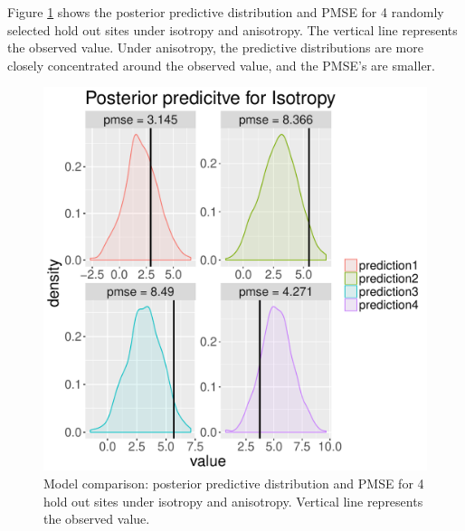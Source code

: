 \documentclass[12pt,twoside]{dukestatscithesis}
\theoremstyle{definition}
\theoremstyle{definition}
\theoremstyle{definition}
\theoremstyle{remark}
\begin{document}
Figure \ref{fig:CRPS} shows the posterior predictive distribution and
PMSE for 4 randomly selected hold out sites under isotropy and
anisotropy. The vertical line represents the observed value. Under
anisotropy, the predictive distributions are more closely concentrated
around the observed value, and the PMSE's are smaller.
\begin{figure}
\includegraphics[scale=0.7]{figure/crps_Iso} \caption{Model comparison: posterior predictive distribution and PMSE for 4 hold out sites under isotropy and anisotropy. Vertical line represents the observed value.}\label{fig:CRPS}
\end{figure}
\end{document}
